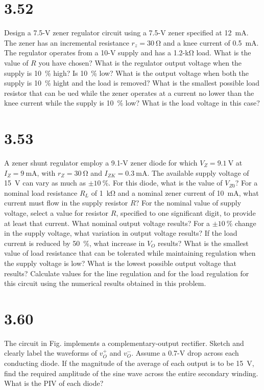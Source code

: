 \documentclass[12pt, a4paper]{article}
\newcommand{\sima}{\milli\ampere}
\newcommand{\siko}{\kilo\ohm}
\newcommand{\siv}{\volt}
\theoremstyle{mystyle}	%
\begin{document}
\section{3.52}
Design a 7.5-\si{\siv} zener regulator circuit using a 7.5-\si{\siv}
zener specified at \SI{12}{\sima}. The zener has an incremental
resistance $r_z = \SI{30}{\ohm}$ and a knee current of \SI{0.5}{\sima}.
The regulator operates from a 10-\si{\siv} supply and has a
1.2-\si{\siko} load. What is the value of $R$ you have chosen?
What is the regulator output voltage when the supply is \SI{10}{\percent}
high? Is \SI{10}{\percent} low? What is the output voltage when both the
supply is \SI{10}{\percent} hight and the load is removed? What is
the smallest possible load resistor that can be ued while the zener
operates at a current no lower than the knee current while the supply
is \SI{10}{\percent} low? What is the load voltage in this case?

\section{3.53}
A zener shunt regulator employ a 9.1-\si{\siv} zener diode for which
$V_Z = \SI{9.1}{\siv}$ at $I_Z = \SI{9}{\sima}$, with $r_Z = \SI{30}{\ohm}$
and $I_{ZK}=\SI{0.3}{\sima}$. The available supply voltage of \SI{15}{\siv}
can vary as much as $\pm\SI{10}{\percent}$. For this diode, what is the
value of $V_{Z0}$? For a nominal load resistance $R_L$ of \SI{1}{\siko}
and a nominal zener current of \SI{10}{\sima}, what current must flow
in the supply resistor $R$? For the nominal value of supply voltage,
select a value for resistor $R$, specified to one significant digit,
to provide at least that current. What nominal output voltage results?
For a $\pm\SI{10}{\percent}$ change in the supply voltage, what variation
in output voltage results? If the load current is reduced by
\SI{50}{\percent}, what increase in $V_O$ results? What is the smallest
value of load resistance that can be tolerated while maintaining
regulation when the supply voltage is low? What is the lowest possible
output voltage that results? Calculate values for the line regulation
and for the load regulation for this circuit using the numerical results
obtained in this problem.

\section{3.60}
The circuit in Fig. implements a complementary-output rectifier.
Sketch and clearly label the waveforms of $v_O^+$ and $v_O^-$.
Assume a 0.7-\si{\siv} drop across each conducting diode. If the
magnitude of the average of each output is to be \SI{15}{\siv}, find
the required amplitude of the sine wave across the entire secondary
winding. What is the PIV of each diode?

% 
\end{document}

